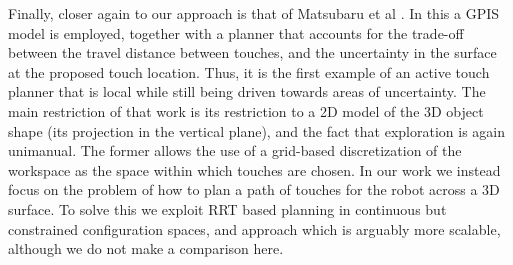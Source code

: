 Finally, closer again to our approach is that of Matsubaru et al \cite{matsubaru2016}. In this a GPIS model is employed, together with a planner that accounts for the trade-off between the travel distance between touches, and the uncertainty in the surface at the proposed touch location. Thus, it is the first example of an active touch planner that is local while still being driven towards areas of uncertainty. The main restriction of that work is its restriction to a 2D model of the 3D object shape (its projection in the vertical plane), and the fact that exploration is again unimanual. The former allows the use of a grid-based discretization of the workspace as the space within which touches are chosen. In our work we instead focus on the problem of how to plan a path of touches for the robot across a 3D surface. To solve this we exploit RRT based planning in continuous but constrained configuration spaces, and approach which is arguably more scalable, although we do not make a comparison here.


